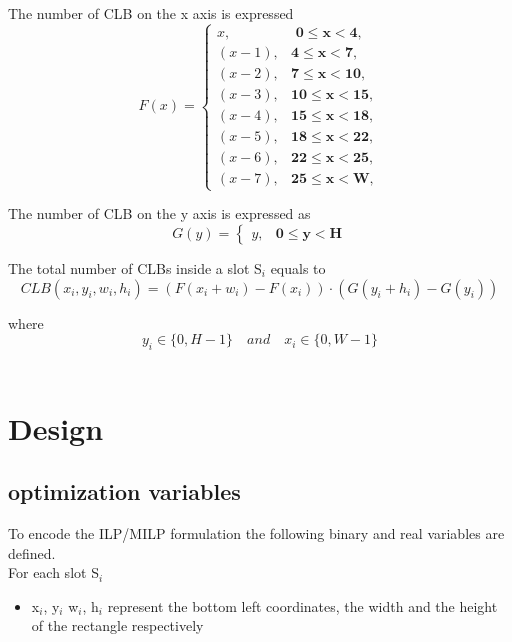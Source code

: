 \documentclass[conference]{IEEEtran}
\begin{document}
The number of CLB on the x axis is expressed 					  
\begin{equation}
F(x) = \begin{cases}
x, & \textbf{ 0$\leq$x$<$4}, \\
(x-1), & \textbf{4$\leq$x$<$7}, \\
(x-2), & \textbf{7$\leq$x$<$10}, \\
(x-3), & \textbf{10$\leq$x$<$15}, \\
(x-4), & \textbf{15$\leq$x$<$18}, \\
(x-5), & \textbf{18$\leq$x$<$22}, \\
(x-6), & \textbf{22$\leq$x$<$25}, \\
(x-7), & \textbf{25$\leq$x$<$W},
\end{cases}
\end{equation}

The number of CLB on the y axis is expressed as 
\begin{equation}
G(y) =  \begin{cases}
y, & \textbf{0$\leq$y$<$H}
\end{cases}
\end{equation}

The total number of CLBs inside a slot S$_i$ equals to \\
\begin{equation}
CLB(x_i,y_i,w_i,h_i) =  (F(x_i+w_i) - F(x_i)) \cdot (G(y_i+h_i) - G(y_i))
\end{equation}					  
			  
					  
\hspace{15mm} where \[y_i\in \{0, H-1 \}  \quad and \quad x_i\in \{0, W-1 \} \] \\

\section{Design}
\subsection{optimization variables}
To encode the ILP/MILP formulation the following binary and real variables are defined. \\
For each slot S$_i$
\begin{itemize}
\item x$_i$, y$_i$ w$_i$, h$_i$ represent the bottom left coordinates, the width and the height of the rectangle respectively
\end{itemize}
\end{document}
